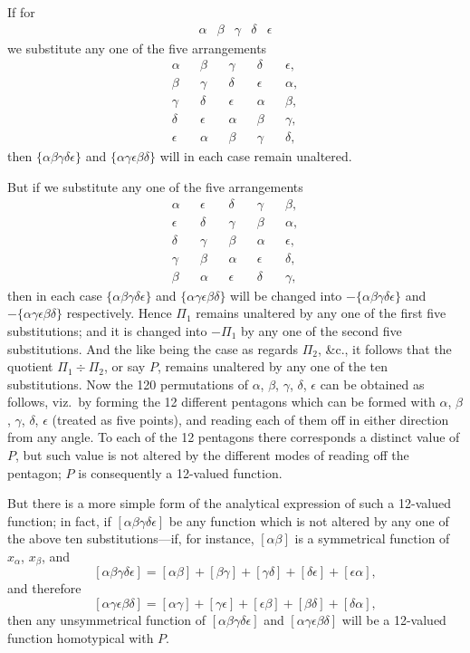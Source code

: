\documentclass[11pt,a4paper]{article}
\theoremstyle{plain}
\begin{document}
If for
\[
\begin{matrix}
\alpha & \beta & \gamma & \delta & \epsilon
\end{matrix}
\]
we substitute any one of the five arrangements
\begin{align*}
\alpha && \beta && \gamma && \delta && \epsilon, \\
\beta && \gamma && \delta && \epsilon && \alpha, \\
\gamma && \delta && \epsilon && \alpha && \beta, \\
\delta && \epsilon && \alpha && \beta && \gamma, \\
\epsilon && \alpha && \beta && \gamma && \delta,
\end{align*}
then $\{\alpha\beta\gamma\delta\epsilon\}$ and $\{\alpha\gamma\epsilon\beta\delta\}$ will in each case remain unaltered.

But if we substitute any one of the five arrangements
\begin{align*}
\alpha && \epsilon && \delta && \gamma && \beta, \\
\epsilon && \delta && \gamma && \beta && \alpha, \\
\delta && \gamma && \beta && \alpha && \epsilon, \\
\gamma && \beta && \alpha && \epsilon && \delta, \\
\beta && \alpha && \epsilon && \delta && \gamma,
\end{align*}
then in each case $\{\alpha\beta\gamma\delta\epsilon\}$ and $\{\alpha\gamma\epsilon\beta\delta\}$ will be changed into $-\{\alpha\beta\gamma\delta\epsilon\}$ and $-\{\alpha\gamma\epsilon\beta\delta\}$ respectively. Hence $\Pi_1$ remains unaltered by any one of the first five substitutions; and it is changed into $-\Pi_1$ by any one of the second five substitutions. And the like being the case as regards $\Pi_2$, \&c., it follows that the quotient $\Pi_1 \div \Pi_2$, or say $P$, remains unaltered by any one of the ten substitutions. Now the 120 permutations of $\alpha$, $\beta$, $\gamma$, $\delta$, $\epsilon$ can be obtained as follows, viz.\ by forming the 12 different pentagons which can be formed with $\alpha$, $\beta$, $\gamma$, $\delta$, $\epsilon$ (treated as five points), and reading each of them off in either direction from any angle. To each of the 12 pentagons there corresponds a distinct value of $P$, but such value is not altered by the different modes of reading off the pentagon; $P$ is consequently a 12-valued function.

But there is a more simple form of the analytical expression of such a 12-valued function; in fact, if $[\alpha\beta\gamma\delta\epsilon]$ be any function which is not altered by any one of the above ten substitutions---if, for instance, $[\alpha\beta]$ is a symmetrical function of $x_\alpha$, $x_\beta$, and
\[
[\alpha\beta\gamma\delta\epsilon] = [\alpha\beta] + [\beta\gamma] + [\gamma\delta] + [\delta\epsilon] + [\epsilon\alpha],
\]
and therefore
\[
[\alpha\gamma\epsilon\beta\delta] = [\alpha\gamma] + [\gamma\epsilon] + [\epsilon\beta] + [\beta\delta] + [\delta\alpha],
\]
then any unsymmetrical function of $[\alpha\beta\gamma\delta\epsilon]$ and $[\alpha\gamma\epsilon\beta\delta]$ will be a 12-valued function homotypical with $P$.
\end{document}
